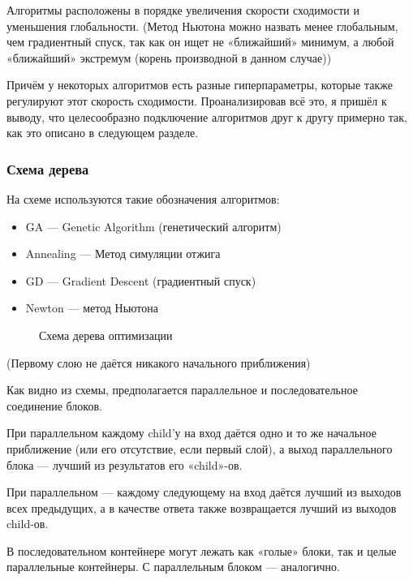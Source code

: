 \documentclass[11pt]{article}
\begin{document}
    Алгоритмы расположены в порядке увеличения скорости сходимости и уменьшения глобальности.
    (Метод Ньютона можно назвать менее глобальным, чем градиентный спуск, так как он ищет не «ближайший» минимум,
    а любой «ближайший» экстремум (корень производной в данном случае))

    Причём у некоторых алгоритмов есть разные гиперпараметры, которые также регулируют этот скорость сходимости.
    Проанализировав всё это, я пришёл к выводу, что целесообразно подключение алгоритмов друг к другу примерно так, как это описано
    в следующем разделе.

    \subsubsection{Схема дерева}

    На схеме используются такие обозначения алгоритмов:
    \begin{itemize}
        \item GA — Genetic Algorithm (генетический алгоритм)
        \item Annealing — Метод симуляции отжига
        \item GD — Gradient Descent (градиентный спуск)
        \item Newton — метод Ньютона
    \end{itemize}

    \begin{figure}[h]
        \centering
        \caption{Схема дерева оптимизации}
        \label{fig:opt-tree}
    \end{figure}
    \FloatBarrier
    (Первому слою не даётся никакого начального приближения)

    Как видно из схемы, предполагается параллельное и последовательное соединение блоков.

    При параллельном каждому child'у на вход даётся одно и то же начальное приближение (или его отсутствие, если первый слой),
    а выход параллельного блока — лучший из результатов его «child»-ов.

    При параллельном — каждому следующему на вход даётся лучший из выходов всех предыдущих,
    а в качестве ответа также возвращается лучший из выходов child-ов.

    В последовательном контейнере могут лежать как «голые» блоки, так и целые параллельные контейнеры.
    С параллельным блоком — аналогично.
\end{document}
